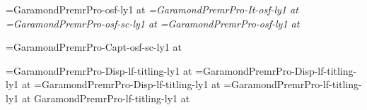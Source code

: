 %
%


\def\romantext{GaramondPremrPro-osf-ly1 }
\def\italictext{GaramondPremrPro-It-osf-ly1 }
\def\smallcaptext{GaramondPremrPro-osf-sc-ly1 }
\def\titlingtext{GaramondPremrPro-lf-titling-ly1 }
\def\smallcapcaption{GaramondPremrPro-Capt-osf-sc-ly1 }
\def\titlingdisplay{GaramondPremrPro-Disp-lf-titling-ly1 }

\newdimen\textsize \textsize=11pt
\newdimen\smalltextsize \smalltextsize=10pt
\newdimen\headlinesize \headlinesize=8pt
\newdimen\booktitlesize \booktitlesize=30pt
\newdimen\authornamesize \authornamesize=24pt
\newdimen\publishernamesize \publishernamesize=24pt
\newdimen\aheadsize \aheadsize=24pt
\newdimen\bheadsize \bheadsize=14pt

\font\rm=\romantext at \textsize
\font\it=\italictext at \textsize
\font\sc=\smallcaptext at \textsize
\font\fineprint=\romantext at \smalltextsize

\font\headlinefont=\smallcapcaption at \headlinesize

\font\booktitlefont=\titlingdisplay at \booktitlesize
\font\authornamefont=\titlingdisplay at \authornamesize
\font\chaptertitlefont=\titlingdisplay at \aheadsize
\font\scenetitlefont=\titlingtext at \bheadsize
\font\authorinfotitlefont \titlingtext at \smalltextsize

\def\footlinefont{\headlinefont}
\def\bookinfotitlefont{\scenetitlefont}



\newdimen\leading \leading=15pt
